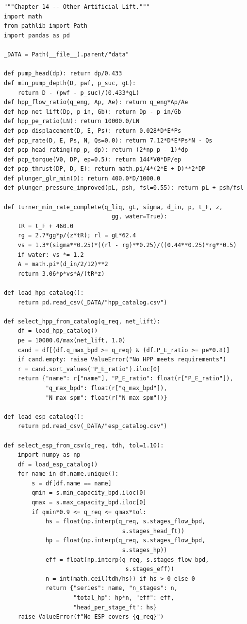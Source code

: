 \documentclass[10pt,a4paper,openany]{book}
\begin{document}
\chapter{}
\begin{lstlisting}
"""Chapter 14 -- Other Artificial Lift."""
import math
from pathlib import Path
import pandas as pd

_DATA = Path(__file__).parent/"data"

def pump_head(dp): return dp/0.433
def min_pump_depth(D, pwf, p_suc, gL):
    return D - (pwf - p_suc)/(0.433*gL)
def hpp_flow_ratio(q_eng, Ap, Ae): return q_eng*Ap/Ae
def hpp_net_lift(Dp, p_in, Gb): return Dp - p_in/Gb
def hpp_pe_ratio(LN): return 10000.0/LN
def pcp_displacement(D, E, Ps): return 0.028*D*E*Ps
def pcp_rate(D, E, Ps, N, Qs=0.0): return 7.12*D*E*Ps*N - Qs
def pcp_head_rating(np_p, dp): return (2*np_p - 1)*dp
def pcp_torque(V0, DP, ep=0.5): return 144*V0*DP/ep
def pcp_thrust(DP, D, E): return math.pi/4*(2*E + D)**2*DP
def plunger_glr_min(D): return 400.0*D/1000.0
def plunger_pressure_improved(pL, psh, fsl=0.55): return pL + psh/fsl

def turner_min_rate_complete(q_liq, gL, sigma, d_in, p, t_F, z,
                               gg, water=True):
    tR = t_F + 460.0
    rg = 2.7*gg*p/(z*tR); rl = gL*62.4
    vs = 1.3*(sigma**0.25)*((rl - rg)**0.25)/((0.44**0.25)*rg**0.5)
    if water: vs *= 1.2
    A = math.pi*(d_in/2/12)**2
    return 3.06*p*vs*A/(tR*z)

def load_hpp_catalog():
    return pd.read_csv(_DATA/"hpp_catalog.csv")

def select_hpp_from_catalog(q_req, net_lift):
    df = load_hpp_catalog()
    pe = 10000.0/max(net_lift, 1.0)
    cand = df[(df.q_max_bpd >= q_req) & (df.P_E_ratio >= pe*0.8)]
    if cand.empty: raise ValueError("No HPP meets requirements")
    r = cand.sort_values("P_E_ratio").iloc[0]
    return {"name": r["name"], "P_E_ratio": float(r["P_E_ratio"]),
            "q_max_bpd": float(r["q_max_bpd"]),
            "N_max_spm": float(r["N_max_spm"])}

def load_esp_catalog():
    return pd.read_csv(_DATA/"esp_catalog.csv")

def select_esp_from_csv(q_req, tdh, tol=1.10):
    import numpy as np
    df = load_esp_catalog()
    for name in df.name.unique():
        s = df[df.name == name]
        qmin = s.min_capacity_bpd.iloc[0]
        qmax = s.max_capacity_bpd.iloc[0]
        if qmin*0.9 <= q_req <= qmax*tol:
            hs = float(np.interp(q_req, s.stages_flow_bpd,
                                  s.stages_head_ft))
            hp = float(np.interp(q_req, s.stages_flow_bpd,
                                  s.stages_hp))
            eff = float(np.interp(q_req, s.stages_flow_bpd,
                                   s.stages_eff))
            n = int(math.ceil(tdh/hs)) if hs > 0 else 0
            return {"series": name, "n_stages": n,
                    "total_hp": hp*n, "eff": eff,
                    "head_per_stage_ft": hs}
    raise ValueError(f"No ESP covers {q_req}")
\end{lstlisting}
\end{document}
